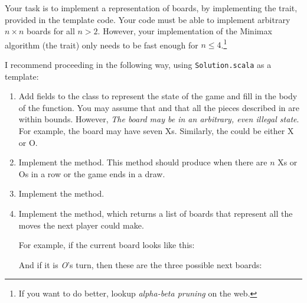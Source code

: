 \documentclass[9pt]{extbook}
\begin{document}
Your task is to implement a representation of boards, by implementing
the  trait, provided in the template code.
Your code must be able to implement arbitrary $n \times n$ boards for
all $n > 2$. However, your implementation of the Minimax algorithm
(the  trait) only needs to be fast enough for
 $n \le 4$.\footnote{If you want to do better, lookup \emph{alpha-beta pruning} on the web.}

I recommend proceeding in the following way, using
\texttt{Solution.scala} as a template:

\begin{enumerate}

\item
   Add fields to the  class to represent the state of the game and
   fill in the body of the  function.
   You may assume that  and that all the pieces described
   in  are within bounds. However, \emph{The board may be in an
   arbitrary, even illegal state}. For example, the board may have seven Xs.
   Similarly, the  could be either X or O.


\item Implement the  method. This method
  should produce  when there are $n$ Xs or Os in a row
  or the game ends in a draw.


\item Implement the  method.

\item Implement the  method, which returns a list of
   boards that represent all the moves the next player could make.

   For example, if the current board looks like this:


And if it is \emph{O}'s turn, then these are the three possible next boards:


\end{enumerate}
\end{document}
